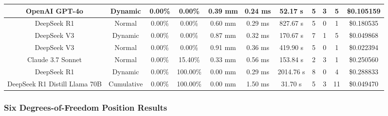 \begin{table}[H]
\begin{center}
\begin{tabular}{|c|c|c|c|c|c|c|c|c|c|c|}
    \hline
    OpenAI GPT-4o & Dynamic & 0.00\% & 0.00\% & 0.39 mm & 0.24 ms & 52.17 s & 5 & 3 & 5 & \$0.105159 \\
    \hline
    DeepSeek R1 & Normal & 0.00\% & 0.00\% & 0.60 mm & 0.29 ms & 827.67 s & 5 & 0 & 1 & \$0.180535 \\
    \hline
    DeepSeek V3 & Dynamic & 0.00\% & 0.00\% & 0.87 mm & 0.32 ms & 170.67 s & 7 & 1 & 5 & \$0.049868 \\
    \hline
    DeepSeek V3 & Normal & 0.00\% & 0.00\% & 0.91 mm & 0.36 ms & 419.90 s & 5 & 0 & 1 & \$0.022394 \\
    \hline
    Claude 3.7 Sonnet & Normal & 0.00\% & 15.40\% & 0.33 mm & 0.56 ms & 153.84 s & 2 & 3 & 1 & \$0.250560 \\
    \hline
    DeepSeek R1 & Dynamic & 0.00\% & 100.00\% & 0.00 mm & 0.29 ms & 2014.76 s & 8 & 0 & 4 & \$0.288833 \\
    \hline
    DeepSeek R1 Distill Llama 70B & Cumulative & 0.00\% & 100.00\% & 0.00 mm & 1.50 ms & 31.70 s & 5 & 3 & 11 & \$0.049470 \\
    \hline
\end{tabular}
\label{Results-Position-2-6}
\end{center}
\end{table}

\subsubsection{Six Degrees-of-Freedom Position Results}


